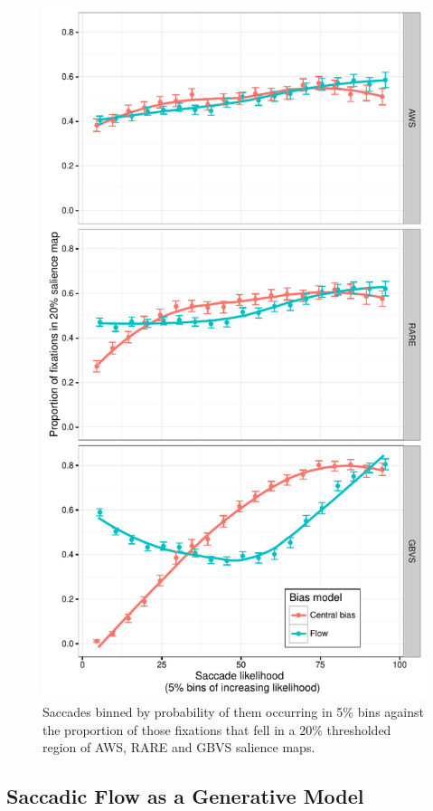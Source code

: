 \begin{figure}
\centering
\includegraphics[width=\columnwidth]{figs/SaccadeSaliency.pdf}
\caption{Saccades binned by probability of them occurring in 5\% bins against the proportion of those fixations that fell in a 20\% thresholded region of AWS, RARE and GBVS salience maps.}
\label{fig:salmaps}
\end{figure}



\subsection{Saccadic Flow as a Generative Model}
\label{sec:humanComp}

